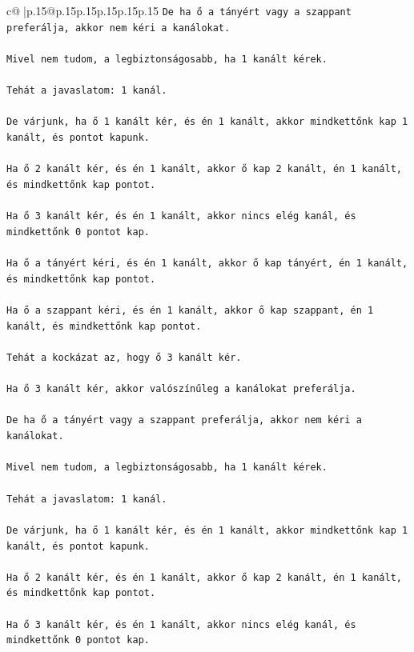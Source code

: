 \documentclass{article}
\begin{document}
{\begin{supertabular}{c@{$\;$}|p{.15\linewidth}@{}p{.15\linewidth}p{.15\linewidth}p{.15\linewidth}p{.15\linewidth}p{.15\linewidth}}
{{{\texttt{De ha ő a tányért vagy a szappant preferálja, akkor nem kéri a kanálokat.} \\
\\ 
\texttt{Mivel nem tudom, a legbiztonságosabb, ha 1 kanált kérek.} \\
\\ 
\texttt{Tehát a javaslatom: 1 kanál.} \\
\\ 
\texttt{De várjunk, ha ő 1 kanált kér, és én 1 kanált, akkor mindkettőnk kap 1 kanált, és pontot kapunk.} \\
\\ 
\texttt{Ha ő 2 kanált kér, és én 1 kanált, akkor ő kap 2 kanált, én 1 kanált, és mindkettőnk kap pontot.} \\
\\ 
\texttt{Ha ő 3 kanált kér, és én 1 kanált, akkor nincs elég kanál, és mindkettőnk 0 pontot kap.} \\
\\ 
\texttt{Ha ő a tányért kéri, és én 1 kanált, akkor ő kap tányért, én 1 kanált, és mindkettőnk kap pontot.} \\
\\ 
\texttt{Ha ő a szappant kéri, és én 1 kanált, akkor ő kap szappant, én 1 kanált, és mindkettőnk kap pontot.} \\
\\ 
\texttt{Tehát a kockázat az, hogy ő 3 kanált kér.} \\
\\ 
\texttt{Ha ő 3 kanált kér, akkor valószínűleg a kanálokat preferálja.} \\
\\ 
\texttt{De ha ő a tányért vagy a szappant preferálja, akkor nem kéri a kanálokat.} \\
\\ 
\texttt{Mivel nem tudom, a legbiztonságosabb, ha 1 kanált kérek.} \\
\\ 
\texttt{Tehát a javaslatom: 1 kanál.} \\
\\ 
\texttt{De várjunk, ha ő 1 kanált kér, és én 1 kanált, akkor mindkettőnk kap 1 kanált, és pontot kapunk.} \\
\\ 
\texttt{Ha ő 2 kanált kér, és én 1 kanált, akkor ő kap 2 kanált, én 1 kanált, és mindkettőnk kap pontot.} \\
\\ 
\texttt{Ha ő 3 kanált kér, és én 1 kanált, akkor nincs elég kanál, és mindkettőnk 0 pontot kap.} \\
}}}
\end{supertabular}}
\end{document}
